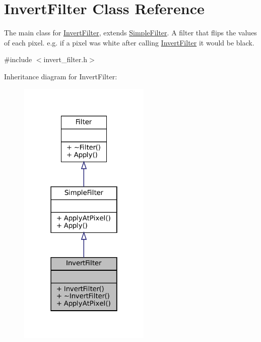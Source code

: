 \hypertarget{classInvertFilter}{}\section{Invert\+Filter Class Reference}
\label{classInvertFilter}


The main class for \hyperlink{classInvertFilter}{Invert\+Filter}, extends \hyperlink{classSimpleFilter}{Simple\+Filter}. A filter that flips the values of each pixel. e.\+g. if a pixel was white after calling \hyperlink{classInvertFilter}{Invert\+Filter} it would be black.  




{\ttfamily \#include $<$invert\+\_\+filter.\+h$>$}



Inheritance diagram for Invert\+Filter\+:\nopagebreak
\begin{figure}[H]
\begin{center}
\leavevmode
\includegraphics[width=178pt]{classInvertFilter__inherit__graph}
\end{center}
\end{figure}


